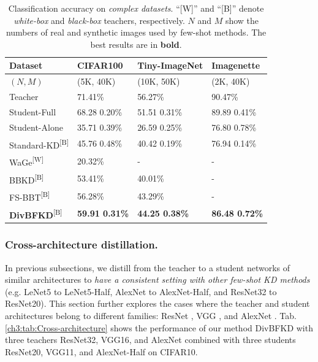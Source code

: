 \begin{table}[ht]
    \centering
    \caption{Classification accuracy on \textit{complex datasets}. ``[W]'' and ``[B]'' denote \textit{white-box} and \textit{black-box} teachers, respectively. $N$ and $M$ show the numbers of real and synthetic images used by few-shot methods. The best results are in \textbf{bold}.}
    \label{ch3:tab:ResultsHundredClasses}
    \begin{tabular}{|l|l|l|l|}
        \hline
        \textbf{Dataset} & \textbf{CIFAR100} & \textbf{Tiny-ImageNet} & \textbf{Imagenette}\tabularnewline
        \hline
        \hline
        $(N,M)$                                   & (5K, 40K) & (10K, 50K) & (2K, 40K)\tabularnewline
        \hline
        Teacher                                   & 71.41\% & 56.27\% & 90.47\%\tabularnewline
        \hline
        Student-Full                              & 68.28 0.20\% & 51.51 0.31\% & 89.89 0.41\%\tabularnewline
        \hline
        Student-Alone                             & 35.71 0.39\% & 26.59 0.25\% & 76.80 0.78\%\tabularnewline
        \hline
        Standard-KD\textsuperscript{[B]}      & 45.76 0.48\% & 40.42 0.19\% & 76.94 0.14\%\tabularnewline
        \hline
        WaGe\textsuperscript{[W]}             & 20.32\% & - & -\tabularnewline
        \hline
        BBKD\textsuperscript{[B]}             & 53.41\% & 40.01\% & -\tabularnewline
        \hline
        FS-BBT\textsuperscript{[B]}           & 56.28\% & 43.29\% & -\tabularnewline
        \hline
        \textbf{DivBFKD}\textsuperscript{[B]} & \textbf{59.91 0.31\%} & \textbf{44.25 0.38\%} & \textbf{86.48 0.72\%}\tabularnewline
        \hline
    \end{tabular}
\end{table}


\subsubsection{Cross-architecture distillation.}
\begin{foldable}
In previous subsections, we distill from the teacher to a student networks of similar architectures to \textit{have a consistent setting with other few-shot KD methods} \cite{kimura2018fewshot,wang2020neural,nguyen2022black} (e.g. LeNet5 to LeNet5-Half, AlexNet to AlexNet-Half, and ResNet32 to ResNet20).
This section further explores the cases where the teacher and student architectures belong to different families: ResNet \cite{he2016deep}, VGG \cite{simonyan2014very}, and AlexNet \cite{krizhevsky2012imagenet}.
Tab. \ref{ch3:tab:Cross-architecture} shows the performance of our method DivBFKD with three teachers ResNet32, VGG16, and AlexNet combined with three students ResNet20, VGG11, and AlexNet-Half on CIFAR10.
\end{foldable}

